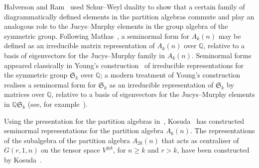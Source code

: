 \documentclass[11pt,a4paper,reqno,svgnames]{amsart}
\theoremstyle{plain}
\theoremstyle{definition}
\numberwithin{equation}{section}
\begin{document}
Halverson and Ram~\cite{MR2143201} used Schur--Weyl duality to show that a certain family of diagrammatically defined elements in the partition algebras commute and play an analogous role to the Jucys--Murphy elements in the group algebra of the symmetric group. Following Mathas~\cite[Sect.~3]{MR2414949}, a seminormal form for $A_k(n)$ may be defined as an irreducible matrix representation of $A_k(n)$ over $\mathbb{Q}$, relative to a basis of eigenvectors for the Jucys--Murphy family in $A_k(n)$. Seminormal forms appeared classically in Young's construction~\cite{Yo:1932} of irreducible representations for the symmetric group $\mathfrak{S}_k$ over $\mathbb{Q}$; a modern treatment of Young's construction realises a seminormal form for $\mathfrak{S}_k$ as an irreducible representation of $\mathfrak{S}_k$ by matrices over $\mathbb{Q}$, relative to a basis of eigenvectors for the Jucys--Murphy elements in $\mathbb{Q}\mathfrak{S}_k$ (see, for example~\cite{MR1444315, MR1711316, MR2165457, MR2050688}). 

Using the presentation for the partition algebras in~\cite{MR2143201, MR2811310}, Kosuda~\cite{MR2583260} has constructed seminormal representations for the partition algebra $A_{6}(n)$. The representations of the subalgebra of the partition algebra $A_{2k}(n)$ that acts as centraliser of $G(r,1,n)$ on the tensor space $V^{\otimes k}$, for $n{\geqslant} k$ and $r>k$, have been constructed by  Kosuda~\cite{MR2262344}. 
\end{document}
